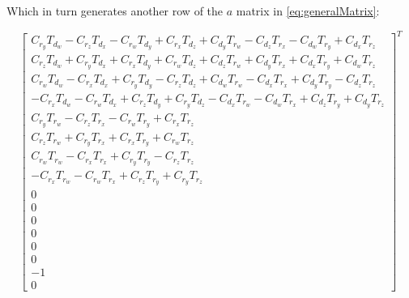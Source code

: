\documentclass[12pt]{article}
\begin{document}
	 Which in turn generates another row of the $a$ matrix in \autoref{eq:generalMatrix}:
	
	 \begin{equation}
	     \begin{bmatrix}
	     C_{r_y} T_{d_w}-C_{r_z} T_{d_x}-C_{r_w} T_{d_y}+C_{r_x} T_{d_z}+C_{d_y} T_{r_w}-C_{d_z} T_{r_x}-C_{d_w} T_{r_y}+C_{d_x} T_{r_z}\\
	     C_{r_z} T_{d_w}+C_{r_y} T_{d_x}+C_{r_x} T_{d_y}+C_{r_w} T_{d_z}+C_{d_z} T_{r_w}+C_{d_y} T_{r_x}+C_{d_x} T_{r_y}+C_{d_w} T_{r_z}\\
	     C_{r_w} T_{d_w}-C_{r_x} T_{d_x}+C_{r_y} T_{d_y}-C_{r_z} T_{d_z}+C_{d_w} T_{r_w}-C_{d_x} T_{r_x}+C_{d_y} T_{r_y}-C_{d_z} T_{r_z}\\
	     -C_{r_x} T_{d_w}-C_{r_w} T_{d_x}+C_{r_z} T_{d_y}+C_{r_y} T_{d_z}-C_{d_x} T_{r_w}-C_{d_w} T_{r_x}+C_{d_z} T_{r_y}+C_{d_y} T_{r_z}\\
	     C_{r_y} T_{r_w}-C_{r_z} T_{r_x}-C_{r_w} T_{r_y}+C_{r_x} T_{r_z}\\
	     C_{r_z} T_{r_w}+C_{r_y} T_{r_x}+C_{r_x} T_{r_y}+C_{r_w} T_{r_z}\\
	     C_{r_w} T_{r_w}-C_{r_x} T_{r_x}+C_{r_y} T_{r_y}-C_{r_z} T_{r_z}\\
	     -C_{r_x} T_{r_w}-C_{r_w} T_{r_x}+C_{r_z} T_{r_y}+C_{r_y} T_{r_z}\\
	     0 \\ 0 \\ 0 \\ 0 \\ 0 \\ 0 \\ -1 \\ 0
	      \end{bmatrix}^T
	  \end{equation}
	  
\end{document}
